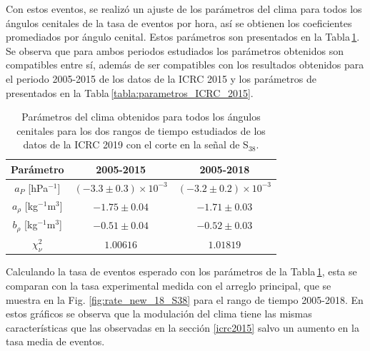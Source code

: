    Con estos eventos, se realizó un  ajuste de los parámetros del clima para todos los ángulos cenitales de la tasa de eventos por hora, así se obtienen los coeficientes promediados por ángulo cenital. Estos parámetros son presentados en la Tabla\,\ref{tabla:parametros_ICRC_2019_S38}. Se observa que para ambos periodos estudiados los parámetros obtenidos son compatibles entre sí, además de ser compatibles con los resultados obtenidos para el periodo 2005-2015 de los datos de la ICRC 2015 y los parámetros de \cite{aab2017impact} presentados en la Tabla\,\ref{tabla:parametros_ICRC_2015}.

   \begin{table}[H]
       \centering
       \begin{tabular}{c|c|c}
       {Parámetro}                 & {2005-2015}    		        & {2005-2018}    \\ \hline \hline
       $a_P$ [hPa$^{-1}$]          & $ (-3.3\pm 0.3)\times 10^{-3}$& $(-3.2\pm 0.2)\times 10^{-3}$  \\ \hline
       $a_\rho$ [kg$^{-1}$m$^3$]   & $ -1.75\pm 0.04$            	& $ -1.71\pm 0.03$       \\ \hline
       $b_\rho$ [kg$^{-1}$m$^3$]   & $ -0.51\pm 0.04$             	& $ -0.52\pm 0.03$       \\ \hline
       $\chi^2_\nu$                & $1.00616$                     & $1.01819$              \\   
       \end{tabular} 
       \caption{Parámetros del clima obtenidos para todos los ángulos cenitales para los dos rangos de tiempo estudiados de los datos de la ICRC 2019 con el corte en la señal de S$_{38}$.} \label{tabla:parametros_ICRC_2019_S38}
   \end{table}
   
   Calculando la tasa de eventos esperado con los parámetros de la Tabla\,\ref{tabla:parametros_ICRC_2019_S38}, esta se comparan con la tasa experimental medida con el arreglo principal, que se muestra en la Fig. \ref{fig:rate_new_18_S38} para el rango de tiempo 2005-2018. En estos gráficos se observa que la modulación del clima tiene las mismas características que las observadas en la sección \ref{icrc2015} salvo un aumento en la tasa media de eventos.

